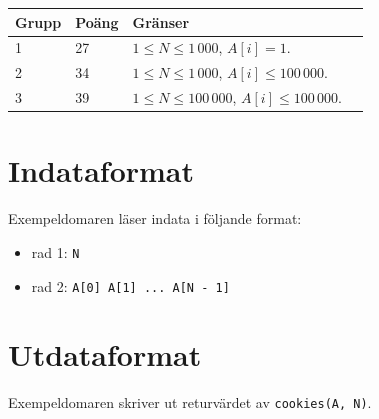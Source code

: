 \begin{tabular}{|l|l|l|p{5cm}|}
  \hline
  \textbf{Grupp} & \textbf{Poäng} & \textbf{Gränser} \\ \hline
  1 & 27 & $1 \le N \le 1\,000$, $A[i] = 1$. \\ \hline
  2 & 34 & $1 \le N \le 1\,000$, $A[i] \le 100\,000$. \\ \hline
  3 & 39 & $1 \le N \le 100\,000$, $A[i] \le 100\,000$. \\ \hline
\end{tabular}

\section*{Indataformat}
Exempeldomaren läser indata i följande format:

\begin{itemize}
  \item rad 1: \texttt{N}
  \item rad 2: \texttt{A[0] A[1] ... A[N - 1]}
\end{itemize}

\section*{Utdataformat}
Exempeldomaren skriver ut returvärdet av \texttt{cookies(A, N)}.
